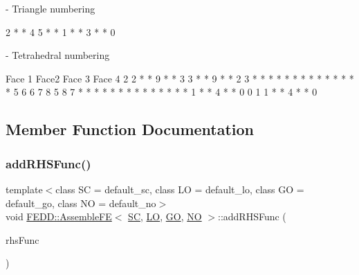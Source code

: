 \begin{DoxyVerb}- Triangle numbering

                2
                *
                *
          4     5
                *
                *
    1 * * 3 * * 0
\end{DoxyVerb}
 



\begin{DoxyVerb}- Tetrahedral numbering

            Face 1          Face2               Face 3            Face 4
                2      2 * * 9 * * 3        3 * * 9 * * 2            3
                *      *          *          *          *           * *
                *      *        *             *        *          *   *
          5     6      6      7                8      5         8     7
                *      *    *                   *    *        *       *
                *      *  *                      *  *       *         *
    1 * * 4 * * 0       0                         1       1 * * 4 * * 0
\end{DoxyVerb}
 



\subsection{Member Function Documentation}
\mbox{\label{classFEDD_1_1AssembleFE_a9eea5124c4b385c2807ad8b20614d050}} 
\subsubsection{\texorpdfstring{add\+R\+H\+S\+Func()}{addRHSFunc()}}
{\footnotesize\ttfamily template$<$class SC  = default\+\_\+sc, class LO  = default\+\_\+lo, class GO  = default\+\_\+go, class NO  = default\+\_\+no$>$ \\
void \hyperlink{classFEDD_1_1AssembleFE}{F\+E\+D\+D\+::\+Assemble\+FE}$<$ \hyperlink{fe__test__laplace_8cpp_a79c7e86a57edbb2a5a53242bcd04e41e}{SC}, \hyperlink{fe__test__laplace_8cpp_ad6a38c9f07d3fd633eefca5bccad8410}{LO}, \hyperlink{fe__test__laplace_8cpp_afa2946b509009b4f45eb04bd8c5b27d9}{GO}, \hyperlink{fe__test__laplace_8cpp_a5e24f37b28787429872b6ecb1d0417ce}{NO} $>$\+::add\+R\+H\+S\+Func (\begin{DoxyParamCaption}\item[{Rhs\+Func\+\_\+\+Type}]{rhs\+Func }\end{DoxyParamCaption})\hspace{0.3cm}{\ttfamily [inline]}}

